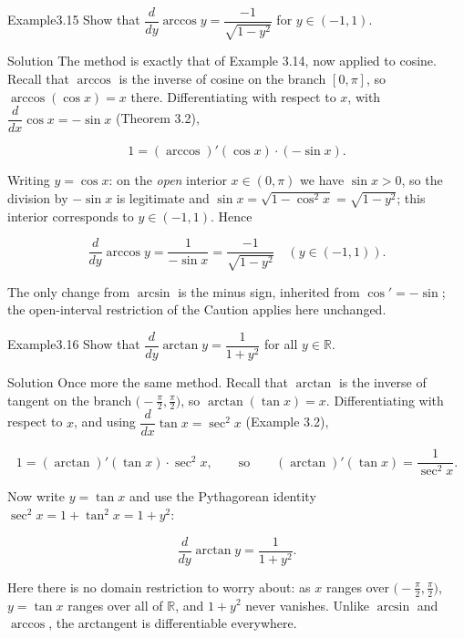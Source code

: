 \documentclass[a4paper,12pt,oneside]{memoir}
\begin{document}
\begin{workedexample}
\begin{envexample}{Example}{3.15}{}
Show that \(\dfrac{d}{dy}\arccos y = \dfrac{-1}{\sqrt{1 - y^{2}}}\) for \(y \in (-1, 1)\).
\end{envexample}
\begin{envsolution}{Solution}{}{}
The method is exactly that of Example 3.14, now applied to cosine. Recall that \(\arccos\) is the inverse of cosine on the branch \([0, \pi]\), so \(\arccos(\cos x) = x\) there. Differentiating with respect to \(x\), with \(\dfrac{d}{dx}\cos x = -\sin x\) (Theorem 3.2),

\[ 1 = (\arccos)'(\cos x)\cdot(-\sin x). \]

Writing \(y = \cos x\): on the \emph{open} interior \(x \in (0, \pi)\) we have \(\sin x > 0\), so the division by \(-\sin x\) is legitimate and \(\sin x = \sqrt{1 - \cos^{2} x} = \sqrt{1 - y^{2}}\); this interior corresponds to \(y \in (-1, 1)\). Hence

\[ \frac{d}{dy}\arccos y = \frac{1}{-\sin x} = \frac{-1}{\sqrt{1 - y^{2}}} \quad (y \in (-1, 1)). \]

The only change from \(\arcsin\) is the minus sign, inherited from \(\cos' = -\sin\); the open-interval restriction of the Caution applies here unchanged.
\end{envsolution}
\end{workedexample}
\begin{workedexample}
\begin{envexample}{Example}{3.16}{}
Show that \(\dfrac{d}{dy}\arctan y = \dfrac{1}{1 + y^{2}}\) for all \(y \in \mathbb{R}\).
\end{envexample}
\begin{envsolution}{Solution}{}{}
Once more the same method. Recall that \(\arctan\) is the inverse of tangent on the branch \(\bigl(-\tfrac{\pi}{2}, \tfrac{\pi}{2}\bigr)\), so \(\arctan(\tan x) = x\). Differentiating with respect to \(x\), and using \(\dfrac{d}{dx}\tan x = \sec^{2} x\) (Example 3.2),

\[ 1 = (\arctan)'(\tan x)\cdot\sec^{2} x, \qquad\text{so}\qquad (\arctan)'(\tan x) = \frac{1}{\sec^{2} x}. \]

Now write \(y = \tan x\) and use the Pythagorean identity \(\sec^{2} x = 1 + \tan^{2} x = 1 + y^{2}\):

\[ \frac{d}{dy}\arctan y = \frac{1}{1 + y^{2}}. \]

Here there is no domain restriction to worry about: as \(x\) ranges over \(\bigl(-\tfrac{\pi}{2}, \tfrac{\pi}{2}\bigr)\), \(y = \tan x\) ranges over all of \(\mathbb{R}\), and \(1 + y^{2}\) never vanishes. Unlike \(\arcsin\) and \(\arccos\), the arctangent is differentiable everywhere.
\end{envsolution}
\end{workedexample}
\end{document}
